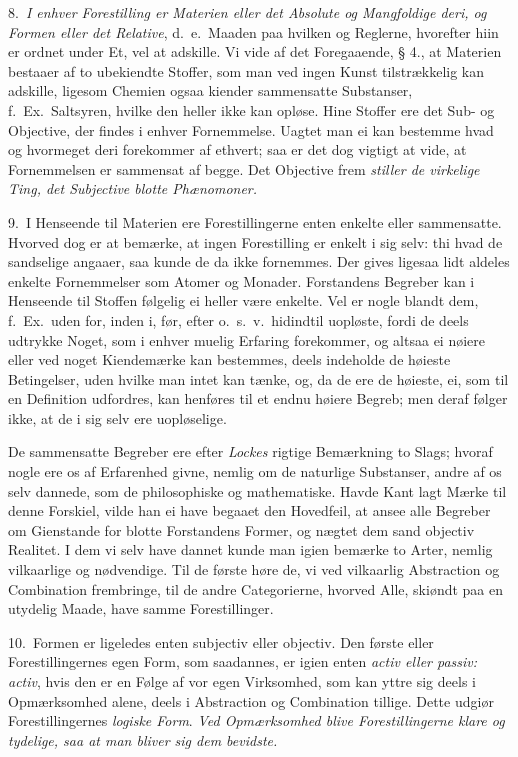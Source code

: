 \documentclass[12pt,a4paper]{article}
\newcommand{\opage}[1]{\marginnote{\footnotesize\textit{[#1]}}}
\begin{document}
8.~\emph{I enhver Forestilling er Materien eller det Absolute og Mangfoldige deri, og
Formen eller det Relative}, d.~e.\ Maaden paa hvilken og Reglerne, hvorefter hiin er
ordnet under Et, vel at adskille. Vi vide af det Foregaaende, § 4., at Materien
bestaaer af to ubekiendte Stoffer, som man ved ingen Kunst tilstrækkelig kan
adskille, ligesom Chemien ogsaa kiender sammensatte Substanser, f.~Ex.\ Saltsyren,
hvilke den heller ikke kan opløse. Hine Stoffer ere det Sub- og Objective, der findes
i enhver Fornemmelse. Uagtet man ei kan bestemme hvad og hvormeget deri forekommer af
ethvert; saa er det dog vigtigt at vide, at Fornemmelsen er sammensat af begge. Det
Objective frem%
\opage{47}\emph{stiller de virkelige Ting, det Subjective blotte Phænomoner.}

9.~I Henseende til Materien ere Forestillingerne enten enkelte eller sammensatte.
Hvorved dog er at bemærke, at ingen Forestilling er enkelt i sig selv: thi hvad de
sandselige angaaer, saa kunde de da ikke fornemmes. Der gives ligesaa lidt aldeles
enkelte Fornemmelser som Atomer og Monader. Forstandens Begreber kan i Henseende til
Stoffen følgelig ei heller være enkelte. Vel er nogle blandt dem, f.~Ex.\ uden for,
inden i, før, efter o.~s.~v.\ hidindtil uopløste, fordi de deels udtrykke Noget, som
i enhver muelig Erfaring forekommer, og altsaa ei nøiere eller ved noget Kiendemærke
kan bestemmes, deels indeholde de høieste Betingelser, uden hvilke man intet kan
tænke, og, da de ere de høieste, ei, som til en Definition udfordres, kan henføres
til et endnu høiere Begreb; men deraf følger ikke, at de i sig selv ere uopløselige.

De sammensatte Begreber ere efter \emph{Lockes} rigtige Bemærkning to Slags; hvoraf
nogle ere os af Erfarenhed givne, nemlig om de naturlige Substanser, andre af os selv
dannede, som de philosophiske og mathematiske. Havde Kant lagt Mærke til denne
Forskiel, vilde han ei have begaaet den Hovedfeil, at ansee alle Begreber om
Gienstande for blotte Forstandens Former, og nægtet dem sand objectiv Realitet. I dem
vi selv have dannet kunde man igien bemærke to Arter,
\opage{48} nemlig vilkaarlige og nødvendige. Til de første høre de, vi ved vilkaarlig
Abstraction og Combination frembringe, til de andre Categorierne, hvorved Alle,
skiøndt paa en utydelig Maade, have samme Forestillinger.

10.~Formen er ligeledes enten subjectiv eller objectiv. Den første eller
Forestillingernes egen Form, som saadannes, er igien enten \emph{activ eller passiv:
activ}, hvis den er en Følge af vor egen Virksomhed, som kan yttre sig deels i
Opmærksomhed alene, deels i Abstraction og Combination tillige. Dette udgiør
Forestillingernes \emph{logiske Form}. \emph{Ved Opmærksomhed blive Forestillingerne
klare og tydelige, saa at man bliver sig dem bevidste.}
\end{document}
